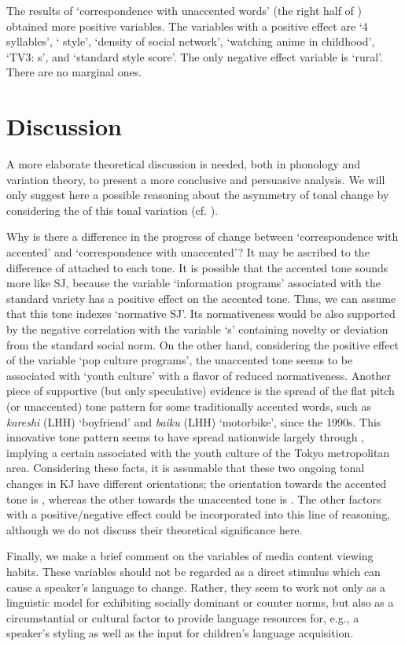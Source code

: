 \documentclass[output=paper]{LSP/langsci}
\begin{document}
The results of  ‘correspondence with unaccented words’ (the right half of ) obtained more positive variables. The variables with a positive effect are ‘4 syllables’, ‘ style’, ‘density of social network’, ‘watching anime in childhood’, ‘TV3: s’, and ‘standard style score’. The only negative effect variable is ‘rural’. There are no marginal ones.

\section{Discussion}
A more elaborate theoretical discussion is needed, both in phonology and variation theory, to present a more conclusive and persuasive analysis. We will only suggest here a possible reasoning about the asymmetry of tonal change by considering the  of this tonal variation (cf. \citealt{eckert_variation_2008}). 

Why is there a difference in the progress of change between `correspondence with accented' and `correspondence with unaccented'? It may be ascribed to the difference of  attached to each tone. It is possible that the accented tone sounds more like SJ, because the variable `information programs' associated with the standard variety has a positive effect on the accented tone. Thus, we can assume that this tone indexes `normative SJ'. Its normativeness would be also supported by the negative correlation with the variable `s' containing novelty or deviation from the standard social norm. On the other hand, considering the positive effect of the variable `pop culture programs', the unaccented tone seems to be associated with `youth culture' with a flavor of reduced normativeness. Another piece of supportive (but only speculative) evidence is the spread of the flat pitch (or unaccented) tone pattern for some traditionally accented words, such as \textit{kareshi }(LHH) `boyfriend' and \textit{baiku} (LHH) `motorbike', since the 1990s. This innovative tone pattern seems to have spread nationwide largely through , implying a certain  associated with the youth culture of the Tokyo metropolitan area. Considering these facts, it is assumable that these two ongoing tonal changes in KJ have different orientations; the orientation towards the accented tone is , whereas the other towards the unaccented tone is . The other factors with a positive/negative effect could be incorporated into this line of reasoning, although we do not discuss their theoretical significance here.

Finally, we make a brief comment on the variables of media content viewing habits. These variables should not be regarded as a direct stimulus which can cause a speaker’s language to change. Rather, they seem to work not only as a linguistic model for exhibiting socially dominant or counter norms, but also as a circumstantial or cultural factor to provide language resources for, e.g., a speaker’s styling as well as the input for children’s language acquisition.
     
\printbibliography[heading=subbibliography,notkeyword=this]
\end{document}
